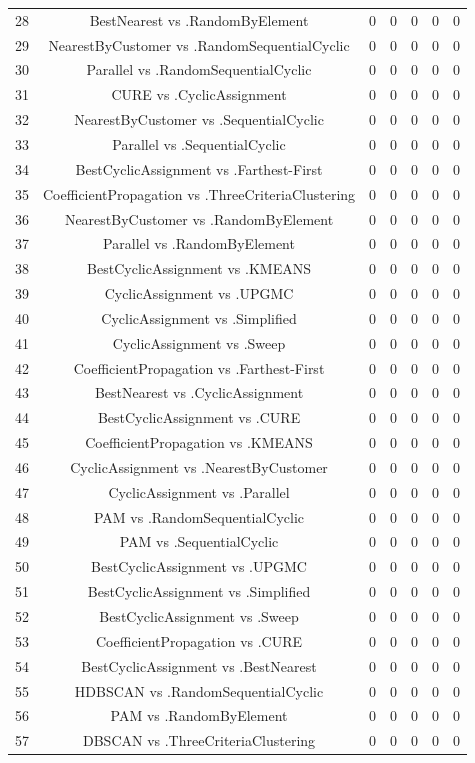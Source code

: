 \documentclass[a4paper,10pt]{article}
\begin{document}
\begin{landscape}
\begin{table}[!htp]
\begin{tabular}{ccccccc}
28&BestNearest vs .RandomByElement&0&0&0&0&0\\
29&NearestByCustomer vs .RandomSequentialCyclic&0&0&0&0&0\\
30&Parallel vs .RandomSequentialCyclic&0&0&0&0&0\\
31&CURE vs .CyclicAssignment&0&0&0&0&0\\
32&NearestByCustomer vs .SequentialCyclic&0&0&0&0&0\\
33&Parallel vs .SequentialCyclic&0&0&0&0&0\\
34&BestCyclicAssignment vs .Farthest-First&0&0&0&0&0\\
35&CoefficientPropagation vs .ThreeCriteriaClustering&0&0&0&0&0\\
36&NearestByCustomer vs .RandomByElement&0&0&0&0&0\\
37&Parallel vs .RandomByElement&0&0&0&0&0\\
38&BestCyclicAssignment vs .KMEANS&0&0&0&0&0\\
39&CyclicAssignment vs .UPGMC&0&0&0&0&0\\
40&CyclicAssignment vs .Simplified&0&0&0&0&0\\
41&CyclicAssignment vs .Sweep&0&0&0&0&0\\
42&CoefficientPropagation vs .Farthest-First&0&0&0&0&0\\
43&BestNearest vs .CyclicAssignment&0&0&0&0&0\\
44&BestCyclicAssignment vs .CURE&0&0&0&0&0\\
45&CoefficientPropagation vs .KMEANS&0&0&0&0&0\\
46&CyclicAssignment vs .NearestByCustomer&0&0&0&0&0\\
47&CyclicAssignment vs .Parallel&0&0&0&0&0\\
48&PAM vs .RandomSequentialCyclic&0&0&0&0&0\\
49&PAM vs .SequentialCyclic&0&0&0&0&0\\
50&BestCyclicAssignment vs .UPGMC&0&0&0&0&0\\
51&BestCyclicAssignment vs .Simplified&0&0&0&0&0\\
52&BestCyclicAssignment vs .Sweep&0&0&0&0&0\\
53&CoefficientPropagation vs .CURE&0&0&0&0&0\\
54&BestCyclicAssignment vs .BestNearest&0&0&0&0&0\\
55&HDBSCAN vs .RandomSequentialCyclic&0&0&0&0&0\\
56&PAM vs .RandomByElement&0&0&0&0&0\\
57&DBSCAN vs .ThreeCriteriaClustering&0&0&0&0&0\\

\end{tabular}
\end{table}
\end{landscape}
\end{document}
